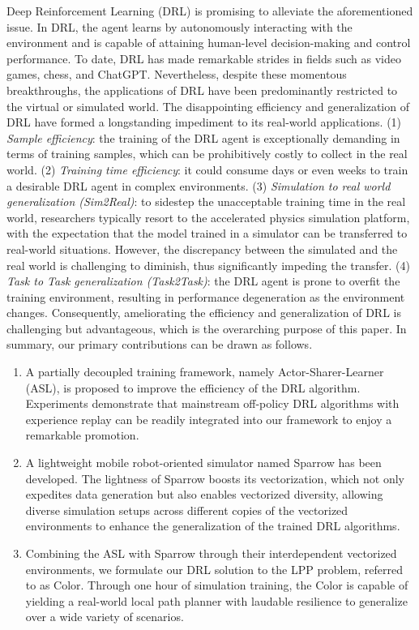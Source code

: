\documentclass[journal]{IEEEtran}
\begin{document}
Deep Reinforcement Learning (DRL) is promising to alleviate the aforementioned issue. In DRL, the agent learns by autonomously interacting with the environment and is capable of attaining human-level decision-making and control performance. To date, DRL has made remarkable strides in fields such as video games\cite{DQN}, chess\cite{AlphaGo}, and ChatGPT\cite{ChatGPT}. Nevertheless, despite these momentous breakthroughs, the applications of DRL have been predominantly restricted to the virtual or simulated world. The disappointing efficiency and generalization of DRL have formed a longstanding impediment to its real-world applications. (1) \textit{Sample efficiency}: the training of the DRL agent is exceptionally demanding in terms of training samples, which can be prohibitively costly to collect in the real world. (2) \textit{Training time efficiency}: it could consume days or even weeks to train a desirable DRL agent in complex environments. (3) \textit{Simulation to real world generalization (Sim2Real)}: to sidestep the unacceptable training time in the real world, researchers typically resort to the accelerated physics simulation platform, with the expectation that the model trained in a simulator can be transferred to real-world situations. However, the discrepancy between the simulated and the real world is challenging to diminish, thus significantly impeding the transfer. (4) \textit{Task to Task generalization (Task2Task)}: the DRL agent is prone to overfit the training environment, resulting in performance degeneration as the environment changes. Consequently, ameliorating the efficiency and generalization of DRL is challenging but advantageous, which is the overarching purpose of this paper. In summary, our primary contributions can be drawn as follows.

\begin{enumerate}
\item{A partially decoupled training framework, namely Actor-Sharer-Learner (ASL), is proposed to improve the efficiency of the DRL algorithm. Experiments demonstrate that mainstream off-policy DRL algorithms with experience replay can be readily integrated into our framework to enjoy a remarkable promotion.}
\item{A lightweight mobile robot-oriented simulator named Sparrow has been developed. The lightness of Sparrow boosts its vectorization, which not only expedites data generation but also enables vectorized diversity, allowing diverse simulation setups across different copies of the vectorized environments to enhance the generalization of the trained DRL algorithms.}

\item{Combining the ASL with Sparrow through their interdependent vectorized environments, we formulate our DRL solution to the LPP problem, referred to as Color. Through one hour of simulation training, the Color is capable of yielding a real-world local path planner with laudable resilience to generalize over a wide variety of scenarios.}
\end{enumerate}
\end{document}
